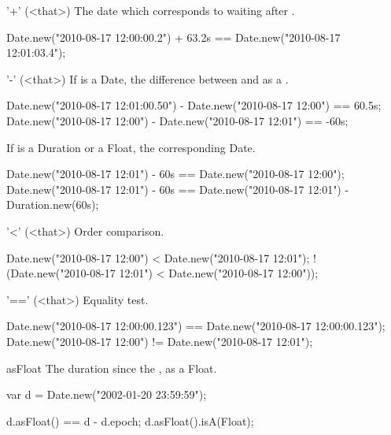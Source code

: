 \begin{urbiscriptapi}
\item['+'](<that>)%
  The date which corresponds to waiting  
  after \this.
\begin{urbiassert}
Date.new("2010-08-17 12:00:00.2") + 63.2s == Date.new("2010-08-17 12:01:03.4");
\end{urbiassert}


\item['-'](<that>)%
  If  is a Date, the difference between \this and  as a
  .
\begin{urbiassert}
Date.new("2010-08-17 12:01:00.50") - Date.new("2010-08-17 12:00") == 60.5s;
Date.new("2010-08-17 12:00")       - Date.new("2010-08-17 12:01") == -60s;
\end{urbiassert}

If  is a Duration or a Float, the corresponding Date.

\begin{urbiassert}
Date.new("2010-08-17 12:01") - 60s == Date.new("2010-08-17 12:00");
Date.new("2010-08-17 12:01") - 60s
  == Date.new("2010-08-17 12:01") - Duration.new(60s);
\end{urbiassert}


\item['<'](<that>)%
  Order comparison.
\begin{urbiassert}
   Date.new("2010-08-17 12:00") < Date.new("2010-08-17 12:01");
! (Date.new("2010-08-17 12:01") < Date.new("2010-08-17 12:00"));
\end{urbiassert}


\item['=='](<that>)%
  Equality test.
\begin{urbiassert}
Date.new("2010-08-17 12:00:00.123") == Date.new("2010-08-17 12:00:00.123");
Date.new("2010-08-17 12:00")        != Date.new("2010-08-17 12:01");
\end{urbiassert}


\item[asFloat] The duration since the , as a Float.
\begin{urbiassert}
var d = Date.new("2002-01-20 23:59:59");

d.asFloat() == d - d.epoch;
d.asFloat().isA(Float);
\end{urbiassert}



\end{urbiscriptapi}
